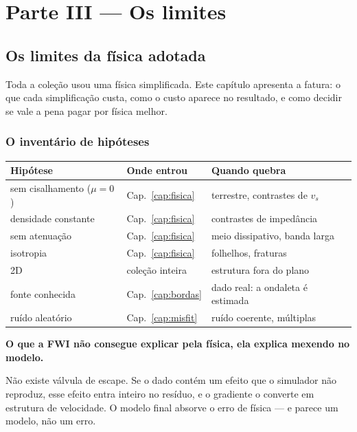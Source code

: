 \documentclass[11pt,a4paper,oneside]{report}
\begin{document}
\part*{\centering\color{azulfwi} Parte III --- Os limites}

\chapter{Os limites da f\'isica adotada}
\label{cap:limites}

\begin{ideia}
Toda a cole\c{c}\~ao usou uma f\'isica simplificada. Este cap\'itulo
apresenta a fatura: o que cada simplifica\c{c}\~ao custa, como o custo
aparece no resultado, e como decidir se vale a pena pagar por f\'isica melhor.
\end{ideia}

\section{O invent\'ario de hip\'oteses}

\begin{center}
\begin{tabular}{@{}lll@{}}
\toprule
\textbf{Hip\'otese} & \textbf{Onde entrou} & \textbf{Quando quebra} \\
\midrule
sem cisalhamento ($\mu=0$) & Cap.~\ref{cap:fisica} & terrestre, contrastes de
  $v_s$ \\
densidade constante & Cap.~\ref{cap:fisica} & contrastes de imped\^ancia \\
sem atenua\c{c}\~ao & Cap.~\ref{cap:fisica} & meio dissipativo, banda larga \\
isotropia & Cap.~\ref{cap:fisica} & folhelhos, fraturas \\
2D & cole\c{c}\~ao inteira & estrutura fora do plano \\
fonte conhecida & Cap.~\ref{cap:bordas} & dado real: a ondaleta \'e estimada \\
ru\'ido aleat\'orio & Cap.~\ref{cap:misfit} & ru\'ido coerente, m\'ultiplas \\
\bottomrule
\end{tabular}
\end{center}

\begin{armadilha}
\textbf{O que a FWI n\~ao consegue explicar pela f\'isica, ela explica mexendo
no modelo.}

N\~ao existe v\'alvula de escape. Se o dado cont\'em um efeito que o
simulador n\~ao reproduz, esse efeito entra inteiro no res\'iduo, e o
gradiente o converte em estrutura de velocidade. O modelo final absorve o erro
de f\'isica --- e parece um modelo, n\~ao um erro.
\end{armadilha}
\end{document}
